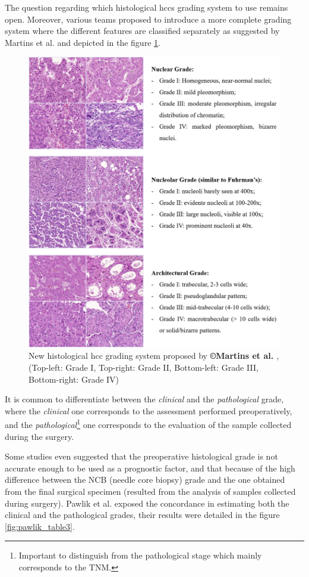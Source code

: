 The question regarding which histological \ac{hcc}s grading system to use
remains open. Moreover, various teams proposed to introduce a more
complete grading system where the different features are classified
separately as suggested by Martins et al. and depicted in the
figure \ref{fig:martins2017_fig5}.

\begin{figure}[th!]
\centering
\includegraphics[width=0.9\linewidth]{../HistologicalGradePrediction/images/martins2017_fig5}
\caption{New histological \ac{hcc} grading system proposed by \textbf{©Martins et al. \cite{Martins2017}}, (Top-left: Grade I, Top-right: Grade II, Bottom-left: Grade III, Bottom-right: Grade IV)}
\label{fig:martins2017_fig5}
\end{figure}


It is common to differentiate between the \emph{clinical} and the
\emph{pathological} grade, where the \emph{clinical} one corresponds to the assessment
performed preoperatively, and the \emph{pathological}\footnote{Important to distinguish from the pathological stage which mainly corresponds to the TNM.} one corresponds to the evaluation
of the sample collected during the surgery.

Some studies even suggested that the preoperative histological grade is
not accurate enough to be used as a prognostic factor, and that because
of the high difference between the NCB (needle core biopsy) grade and the
one obtained from the final surgical specimen (resulted from the
analysis of samples collected during surgery). Pawlik et al.
exposed the concordance in estimating both the clinical and the pathological grades, their results were detailed in the figure \ref{fig:pawlik_table3}.


